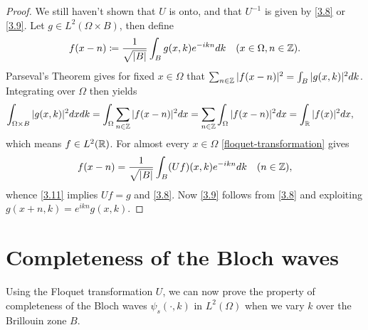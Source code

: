 \begin{theorem}
\begin{proof}
		We still haven't shown that $U$ is onto, and that $U^{-1}$ is given by \eqref{3.8} or \eqref{3.9}. Let $g \in L^{2}(\Omega \times B)$, then define
		\begin{equation}
			f(x - n) \coloneqq \frac{1}{\sqrt{|B|}} \int_{B} g(x, k) e^{-ikn} dk \quad (x \in \Omega, n \in\mathbb{Z}).\label{3.11}
		\end{equation}
		Parseval's Theorem gives for fixed $x \in \Omega$ that $\sum_{n \in \mathbb{Z}} |f(x - n)|^{2} = \int_{B} |g(x, k)|^{2} dk$. Integrating over $\Omega$ then yields
		\begin{align*}
			\int_{\Omega \times B} |g(x, k)|^{2} dx dk & = \int_{\Omega} \sum_{n \in \mathbb{Z}} |f(x - n)|^{2} dx  = \sum_{n \in\mathbb{Z}} \int_{\Omega} |f(x-n)|^{2} dx = \int_{\mathbb{R}} |f(x)|^{2} dx,	
		\end{align*}
		which means $f \in L^{2}(\mathbb{R})$. For almost every $x \in \Omega$ \eqref{floquet-transformation} gives
		\[ f(x - n) = \frac{1}{\sqrt{|B|}} \int_{B} (Uf)(x,k) e^{-ikn} dk \quad (n \in \mathbb{Z}), \]
		whence \eqref{3.11} implies $U f = g$ and \eqref{3.8}. Now \eqref{3.9} follows from \eqref{3.8} and exploiting $g(x + n, k) = e^{ikn} g(x, k)$.
	\end{proof}				
\end{theorem}

\section{Completeness of the Bloch waves}

Using the Floquet transformation $U$, we can now prove the property of completeness of the Bloch waves $\psi_{s}(\cdot, k)$ in $L^{2}(\Omega)$ when we vary $k$ over the Brillouin zone $B$.
	
